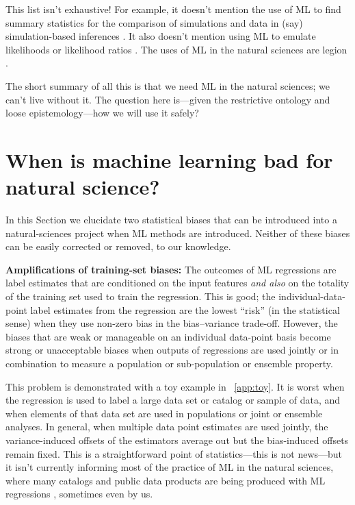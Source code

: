 \documentclass{article}
\renewcommand{\paragraph}[1]{\noindent\par\textbf{#1}}
\newcommand{\sectionname}{Section}
\begin{document}
\medskip
This list isn't exhaustive!
For example, it doesn't mention the use of ML to find summary statistics for the comparison of simulations and data in (say) simulation-based inferences \cite{sbi, simbig}.
It also doesn't mention using ML to emulate likelihoods or likelihood ratios \cite{biwei, likelihood_ratio}.
The uses of ML in the natural sciences are legion \cite{wang2023scientific,zhang2023artificial}.

The short summary of all this is that we need ML in the natural sciences; we can't live without it.
The question here is---given the restrictive ontology and loose epistemology---how we will use it safely?

\section{When is machine learning bad for natural science?}\label{sec:bad}
In this \sectionname{} we elucidate two statistical biases that can be introduced into a natural-sciences project when ML methods are introduced.
Neither of these biases can be easily corrected or removed, to our knowledge.

\paragraph{Amplifications of training-set biases:}
The outcomes of ML regressions are label estimates that are conditioned on the input features \emph{and also} on the totality of the training set used to train the regression.
This is good; the individual-data-point label estimates from the regression are the lowest ``risk'' (in the statistical sense) when they use non-zero bias in the bias--variance trade-off.
However, the biases that are weak or manageable on an individual data-point basis become strong or unacceptable biases when outputs of regressions are used jointly or in combination to measure a population or sub-population or ensemble property.

This problem is demonstrated with a toy example in \appendixname~\ref{app:toy}.
It is worst when the regression is used to label a large data set or catalog or sample of data,
and when elements of that data set are used in populations or joint or ensemble analyses.
In general, when multiple data point estimates are used jointly, the variance-induced offsets of the estimators average out but the bias-induced offsets remain fixed.
This is a straightforward point of statistics---this is not news---but it isn't currently informing most of the practice of ML in the natural sciences, where many catalogs and public data products are being produced with ML regressions \cite{spectrophotometric, leung, aspgap}, sometimes even by us.
\end{document}
